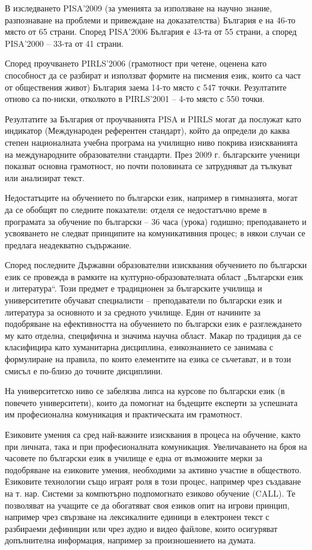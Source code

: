 \documentclass[]{../../metanetpaper}
\begin{document}
\begin{multicols}{2}
В изследването PISA'2009 \cite{oecd} (за уменията за използване на
 научно знание, разпознаване на проблеми и привеждане
 на доказателства) България е на 46-то място от 65 страни.
 Според PISA'2006 България е 43-та от 55 страни, а според
 PISA'2000 – 33-та от 41 страни.
 
Според проучването PIRLS'2006 \cite{nces} (грамотност при четене, оценена като способност да се разбират и използват формите на писмения език, които са част от обществения живот) България заема 14-то място с 547 точки. Резултатите отново са по-ниски, отколкото в PIRLS'2001 – 4-то място с 550 точки.

Резултатите за България от проучванията PISA и PIRLS могат да послужат като индикатор (Международен референтен стандарт), който да определи до каква степен
 националната учебна програма на училищно ниво
 покрива
 изискванията
 на
 международните образователни стандарти. През 2009 г. българските ученици показват основна грамотност, но почти половината се затрудняват да тълкуват или анализират
 текст.

Недостатъците на обучението по български език, например в гимназията, могат да се обобщят по следните
 показатели: отделя се недостатъчно време в програмата
 за обучение по български – 36 часа (урока) годишно;
 преподаването и усвояването не следват принципите на
 комуникативния процес; в някои случаи се предлага неадекватно
 съдържание.

Според последните Държавни образователни изисквания обучението по български език се провежда в рамките на културно-образователната област „Български
 език и литература“. Този предмет е традиционен за
 българските училища и университетите обучават
 специалисти – преподаватели по български език и литература за
 основното и за средното училище. Един от начините за
 подобряване на ефективността на обучението по български
 език е разглеждането му като отделна, специфична и значима научна област. Макар по традиция да се
 класифицира
 като
 хуманитарна
 дисциплина,
 езикознанието се занимава с формулиране на правила,
 по които елементите на езика се съчетават, и в този
 смисъл е по-близо до точните дисциплини.

На университетско ниво се забелязва липса на курсове по
 български език (в повечето университети), които да помогнат на
 бъдещите експерти за успешната им професионална
 комуникация и практическата им грамотност.

Езиковите умения са сред най-важните изисквания в процеса на обучение, както при личната, така и при професионалната комуникация. Увеличаването на броя
 на часовете по български език в училище е една от
 възможните мерки за подобряване на езиковите умения, необходими за активно участие в
 обществото. Езиковите технологии също играят роля в
 този процес, например чрез създаване на т. нар. Системи
 за компютърно подпомогнато езиково обучение (CALL).
 Те позволяват на учащите се да обогатяват своя езиков
 опит на игрови принцип, например чрез свързване на
 лексикалните единици в електронен текст с разбираеми
 дефиниции или
 чрез аудио и видео файлове, които
 осигуряват допълнителна информация, например за произношението на думата. 


\end{multicols}
\end{document}
